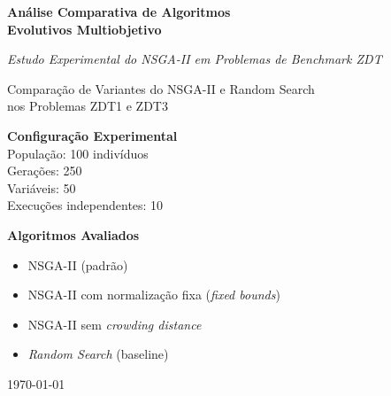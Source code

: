 
\begin{titlepage}
    \centering
    \vspace*{2cm}
    
    {\Huge\bfseries Análise Comparativa de Algoritmos\\[0.5cm] Evolutivos Multiobjetivo\par}
    
    \vspace{1.5cm}
    
    {\Large\itshape Estudo Experimental do NSGA-II em Problemas de Benchmark ZDT\par}
    
    \vspace{2cm}
    
    {\Large
    Comparação de Variantes do NSGA-II e Random Search\\
    nos Problemas ZDT1 e ZDT3
    \par}
    
    \vfill
    
    {\large
    \textbf{Configuração Experimental}\\[0.3cm]
    População: 100 indivíduos\\
    Gerações: 250\\
    Variáveis: 50\\
    Execuções independentes: 10\\
    \par}
    
    \vspace{1cm}
    
    {\large
    \textbf{Algoritmos Avaliados}\\[0.3cm]
    \begin{itemize}
        \item NSGA-II (padrão)
        \item NSGA-II com normalização fixa (\textit{fixed bounds})
        \item NSGA-II sem \textit{crowding distance}
        \item \textit{Random Search} (baseline)
    \end{itemize}
    \par}
    
    \vfill
    
    {\large \today\par}
\end{titlepage}
